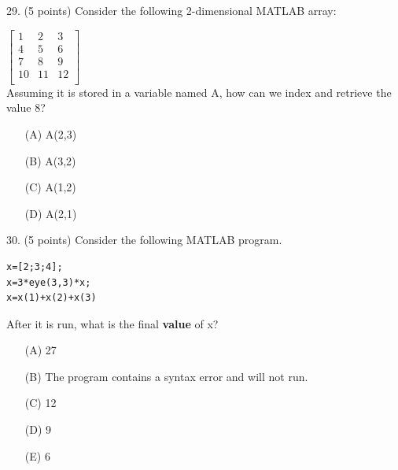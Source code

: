 \documentclass{article}
\begin{document}
\noindent
\begin{minipage}{\textwidth}
29. (5 points)
Consider the following 2-dimensional MATLAB array:

$ \left[ \begin{array}{ccc} 1 & 2 & 3 \\ 4 & 5 & 6 \\ 7 & 8 & 9 \\ 10 & 11 & 12 \\ \end{array} \right] $ \\

Assuming it is stored in a variable named A, how can we index and retrieve the value 8?

\begin{enumerate}
\item[(A)]
A(2,3)

\item[(B)]
A(3,2)

\item[(C)]
A(1,2)

\item[(D)]
A(2,1)

\end{enumerate}
\end{minipage}
\vspace{10em}
\filbreak\vfil{}\vfilneg

\noindent
\begin{minipage}{\textwidth}
30. (5 points)
Consider the following MATLAB program.
\begin{verbatim}
x=[2;3;4];
x=3*eye(3,3)*x;
x=x(1)+x(2)+x(3)
\end{verbatim}
After it is run, what is the final \textbf{value} of x?

\begin{enumerate}
\item[(A)]
27

\item[(B)]
The program contains a syntax error and will not run.

\item[(C)]
12

\item[(D)]
9

\item[(E)]
6

\end{enumerate}
\end{minipage}
\vspace{10em}
\filbreak\vfil{}\vfilneg
\end{document}
